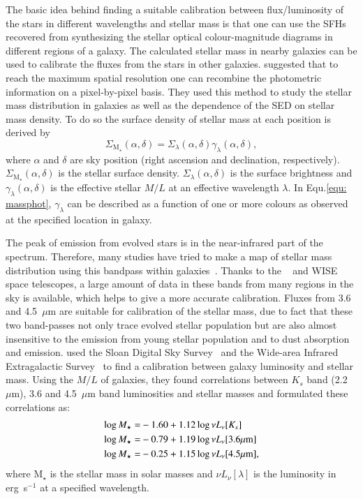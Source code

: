 The basic idea behind finding a suitable calibration between flux/luminosity of the stars in different wavelengths and stellar mass is that one can use the SFHs recovered from synthesizing the stellar optical colour-magnitude diagrams in different regions of a galaxy. 
The calculated stellar mass in nearby galaxies can be used to calibrate the fluxes from the stars in other galaxies.
\cite{Zibetti09} suggested that to reach the maximum spatial resolution one can recombine the photometric information on a pixel-by-pixel basis. 
They used this method to study the stellar mass distribution in galaxies as well as the dependence of the SED on stellar mass density.
To do so the surface density of stellar mass at each position is derived by 
\begin{equation}
\label{equ: massphot}
\Sigma_{{\mathrm M_\star}} (\alpha, \delta) = \Sigma_{\lambda}(\alpha, \delta) \gamma_{\lambda}(\alpha, \delta),
\end{equation}
where $\alpha$ and $\delta$ are sky position (right ascension and declination, respectively).
$\Sigma_{{\mathrm M_\star}} (\alpha, \delta)$ is the stellar surface density.
$\Sigma_{\lambda}(\alpha, \delta)$ is the surface brightness and $\gamma_{\lambda}(\alpha, \delta)$ is the effective stellar $M/L$ at an effective wavelength $\lambda$.
In Equ.\ref{equ: massphot},  $\gamma_{\lambda}$ can be described as a function of one or more colours as observed at the specified location in galaxy. 

The peak of emission from evolved stars is in the near-infrared part of the spectrum.
Therefore, many studies have tried to make a map of stellar mass distribution using this bandpass within galaxies~\citep[e.g.,][]{Elmgreen84}.
Thanks to the \Spitzer~\citep{Wener04} and WISE~\citep{Wright10} space telescopes, a large amount of data in these bands from many regions in the sky is available, which helps to give a more accurate calibration. 
Fluxes from 3.6 and 4.5~$\mu$m are suitable for calibration of the stellar mass, due to fact that these two band-passes not only trace evolved stellar population but are also almost insensitive to the emission from young stellar population and to dust absorption and emission. 
\cite{Zhu10} used the Sloan Digital Sky Survey~\citep[SDSS][]{York00} and the \Spitzer Wide-area Infrared Extragalactic Survey~\citep[SWIRE;][]{Lonsdale03} to find a calibration between galaxy luminosity and stellar mass. 
Using the $M/L$ of galaxies, they found correlations between $K_s$ band (2.2~$\mu$m), 3.6 and 4.5~$\mu$m band luminosities and stellar masses and formulated these correlations as:
\begin{equation}
\begin{split}
\label{equ: zhu1}
\log M_{\star} =& -1.60  + 1.12  \log \nu L_{\nu}[K_s]\\
\log M_{\star} =& -0.79 + 1.19 \log \nu L_{\nu}[3.6\mu \rm m]\\
\log M_{\star} =&-0.25 + 1.15\log \nu L_{\nu}[4.5\mu \rm m], 
\end{split}
\end{equation}
where M$_{\star}$ is the stellar mass in solar masses and $ \nu L_{\nu}[\lambda]$ is the luminosity in erg~s$^{-1}$ at a specified wavelength.


